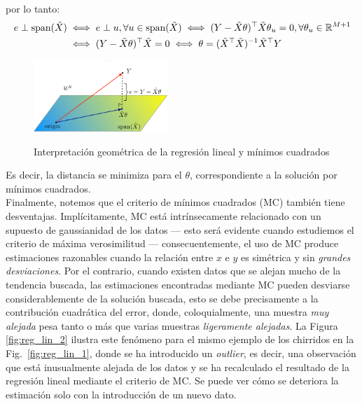 por lo tanto:
\begin{align}
	 e\perp \text{span}(\tilde{X}) &\iff e\perp u,\forall u \in \text{span}(\tilde{X}) \iff (Y-\tilde{X} \theta)^\top \tilde{X} \theta_u = 0, \forall \theta_u \in \mathbb{R}^{M+1} \nonumber\\
	& \iff (Y-\tilde{X} \theta)^\top \tilde{X}=0 \iff  \theta = (\tilde{X}^\top\tilde{X})^{-1}\tilde{X}^\top Y
\end{align}

\begin{figure}[t]
	\centering
	\includegraphics[width=0.45\textwidth]{img/cap2_intuicionLinReg.pdf}\\
	\caption{Interpretación geométrica de la regresión lineal y mínimos cuadrados}
	\label{fig:projection}
\end{figure}

Es decir, la distancia se minimiza para el $\theta$, correspondiente a la solución por mínimos cuadrados.\\

Finalmente, notemos que el criterio de  mínimos cuadrados (MC) también tiene desventajas. Implícitamente, MC está intrínsecamente relacionado con un supuesto de gaussianidad de los datos --- esto será evidente cuando estudiemos el criterio de máxima verosimilitud --- consecuentemente, el uso de MC produce estimaciones razonables cuando la relación entre $x$  e $y$ es simétrica y sin \emph{grandes desviaciones}. Por el contrario, cuando existen datos que se alejan mucho de la tendencia buscada, las estimaciones encontradas mediante MC pueden desviarse considerablemente de la solución buscada, esto se debe precisamente a la contribución cuadrática del error, donde, coloquialmente, una muestra \emph{muy alejada} pesa tanto o más que varias muestras \emph{ligeramente alejadas}. La Figura \ref{fig:reg_lin_2} ilustra este fenómeno para el mismo ejemplo de los chirridos en la Fig.~\ref{fig:reg_lin_1}, donde se ha introducido un \emph{outlier}, es decir, una observación que está inusualmente alejada de los datos y se ha recalculado el resultado de la regresión lineal mediante el criterio de MC. Se puede ver cómo se deteriora la estimación solo con la introducción de un nuevo dato. 

